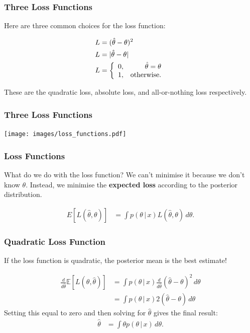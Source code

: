 \documentclass{beamer}
\newcommand{\given}{\,|\,}
\begin{document}
\begin{frame}
\frametitle{Three Loss Functions}
Here are three common choices for the loss function:

\begin{align}
L &= (\hat{\theta} - \theta)^2 \\
L &= |\hat{\theta} - \theta| \\
L &= \left\{
        \begin{array}{lr}
        0, & \hat{\theta} = \theta \\
        1, & \textnormal{otherwise.}
        \end{array}
        \right.
\end{align}

These are the quadratic loss, absolute loss, and all-or-nothing loss
respectively.
\end{frame}



\begin{frame}
\frametitle{Three Loss Functions}

\centering
\texttt{[image: images/loss\_functions.pdf]}

\end{frame}

\begin{frame}
\frametitle{Loss Functions}
What do we do with the loss function? We can't minimise it because we don't
know $\theta$. Instead, we minimise the {\bf expected loss} according to the
posterior distribution.

\begin{align}
E\left[L(\hat{\theta}, \theta)\right]
    &= \int p(\theta \given x) L(\hat{\theta}, \theta) \, d\theta.
\end{align}

\end{frame}


\begin{frame}
\frametitle{Quadratic Loss Function}
If the loss function is quadratic, the posterior mean is the best estimate!

\begin{align}
\frac{d}{d\hat{\theta}}\mathds{E}\left[L(\theta, \hat{\theta})\right] &=
\int p(\theta \given x)\frac{d}{d\hat{\theta}}(\hat{\theta} - \theta)^2 \, d\theta \\
&= \int p(\theta\given x)2(\hat{\theta} - \theta) \, d\theta
\end{align}
Setting this equal to zero and then solving for $\hat{\theta}$ gives the final
result:
\begin{align}
\hat{\theta} &= \int \theta p(\theta\given x) \, d\theta.
\end{align}


\end{frame}
\end{document}
